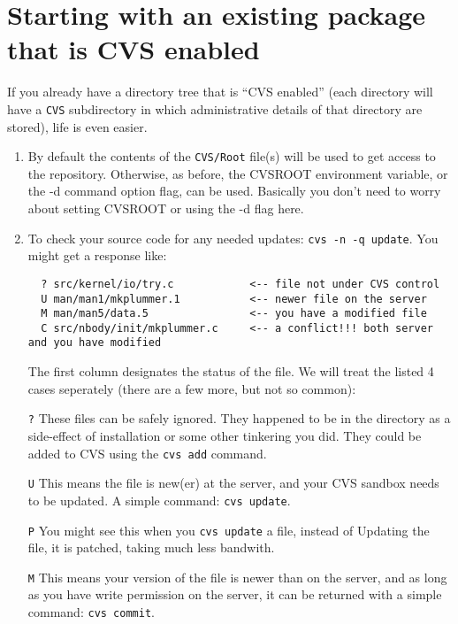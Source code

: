 \section{Starting with an existing package that is CVS enabled}

If you already have a directory tree that is ``CVS enabled'' (each
directory will have a {\tt CVS} subdirectory in which administrative
details of that directory are stored), life is even easier.

\begin{enumerate}

\item By default the contents of the {\tt CVS/Root} file(s) will be used to
get access to the repository. Otherwise, as before, the CVSROOT environment
variable, or the -d command option flag, can be used. Basically you
don't need to worry about setting CVSROOT or using the -d flag here.

\item To check your source code for any needed updates: {\tt cvs -n -q update}.
You might get a response like:
\footnotesize\begin{verbatim}
  ? src/kernel/io/try.c            <-- file not under CVS control
  U man/man1/mkplummer.1           <-- newer file on the server
  M man/man5/data.5                <-- you have a modified file
  C src/nbody/init/mkplummer.c     <-- a conflict!!! both server and you have modified
\end{verbatim}\normalsize
The first column designates the status of the file. 
We will treat the listed 4 cases seperately (there are a few more, but not
so common):

\item[{\tt ?}] 
These files can be safely ignored. They happened to be in the directory
as a side-effect of installation or some other tinkering you did. They could
be added to CVS using the {\tt cvs add} command.

\item[{\tt U}] 
This means the file is new(er) at the server, and your
CVS sandbox needs to be updated. A simple command: {\tt cvs update}.

\item[{\tt P}] You might see this when you {\tt cvs update} a file, instead
of Updating the file, it is patched, taking much less bandwith.

\item[{\tt M}] This means your version of the file is newer than on
the server, 
and as long as you have write permission on the server, it can be returned
with a simple command: {\tt cvs commit}.


\end{enumerate}
